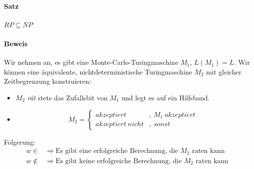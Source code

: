 \paragraph{Satz}
$RP \subseteq NP$

\paragraph{Beweis}
Wir nehmen an, es gibt eine Monte-Carlo-Turingmaschine $M_1$, $L(M_1) = L$.
Wir können eine äquivalente, nichtdeterministische Turingmaschine $M_2$ mit gleicher Zeitbegrenzung konstruieren:
\begin{itemize}
	\item $M_2$ \emph{rät} stets das Zufallsbit von $M_1$ und legt es auf ein Hilfsband.
	\item \begin{equation*}
		M_2 =
		\begin{cases}
			akzeptiert &,\ M_1\ akzeptiert\\
			akzeptiert\ nicht &,\ sonst
		\end{cases}
	\end{equation*}
\end{itemize}
Folgerung:
\begin{align*}
	w \in &\Rightarrow \text{Es gibt eine erfolgreiche Berechnung, die }M_2\text{ raten kann}\\
	w \notin &\Rightarrow \text{Es gibt keine erfolgreiche Berechnung, die }M_2\text{ raten kann}
\end{align*}